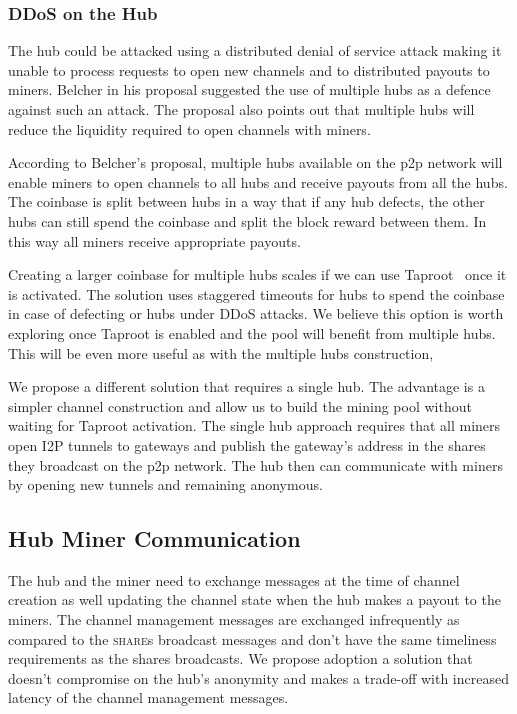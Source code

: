 \documentclass{article}
\begin{document}
\subsubsection{DDoS on the Hub}\label{ref:ddos-attack}

The hub could be attacked using a distributed denial of service attack
making it unable to process requests to open new channels and to
distributed payouts to miners. Belcher in his proposal suggested the
use of multiple hubs as a defence against such an attack. The proposal
also points out that multiple hubs will reduce the liquidity required
to open channels with miners.

According to Belcher's proposal, multiple hubs available on the p2p
network will enable miners to open channels to all hubs and receive
payouts from all the hubs. The coinbase is split between hubs in a way
that if any hub defects, the other hubs can still spend the coinbase
and split the block reward between them. In this way all miners
receive appropriate payouts.

Creating a larger coinbase for multiple hubs scales if we can use
Taproot~\cite{bip340,bip341, bip342} once it is activated. The
solution uses staggered timeouts for hubs to spend the coinbase in
case of defecting or hubs under DDoS attacks. We believe this option
is worth exploring once Taproot is enabled and the pool will benefit
from multiple hubs. This will be even more useful as with the multiple
hubs construction, 

We propose a different solution that requires a single hub. The
advantage is a simpler channel construction and allow us to build the
mining pool without waiting for Taproot activation. The single hub
approach requires that all miners open I2P tunnels to gateways and
publish the gateway's address in the shares they broadcast on the p2p
network. The hub then can communicate with miners by opening new
tunnels and remaining anonymous.

\subsection{Hub Miner
  Communication}\label{sec:hub-miner-communication}

The hub and the miner need to exchange messages at the time of channel
creation as well updating the channel state when the hub makes a
payout to the miners. The channel management messages are exchanged
infrequently as compared to the \textsc{share}s broadcast messages and
don't have the same timeliness requirements as the shares
broadcasts. We propose adoption a solution that doesn't compromise on
the hub's anonymity and makes a trade-off with increased latency of
the channel management messages.
\end{document}

